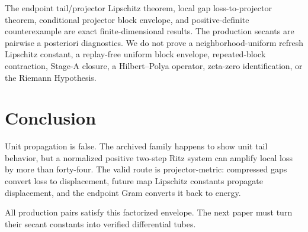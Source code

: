 \documentclass[11pt]{article}
\theoremstyle{definition}
\theoremstyle{remark}
\begin{document}
The endpoint tail/projector Lipschitz theorem, local gap loss-to-projector
theorem, conditional projector block envelope, and positive-definite
counterexample are exact finite-dimensional results.  The production secants
are pairwise a posteriori diagnostics.  We do not prove a neighborhood-uniform
refresh Lipschitz constant, a replay-free uniform block envelope,
repeated-block contraction, Stage-A closure, a Hilbert--Polya operator,
zeta-zero identification, or the Riemann Hypothesis.

\section{Conclusion}

Unit propagation is false.  The archived family happens to show unit tail
behavior, but a normalized positive two-step Ritz system can amplify local
loss by more than forty-four.  The valid route is projector-metric:
compressed gaps convert loss to displacement, future map Lipschitz constants
propagate displacement, and the endpoint Gram converts it back to energy.

All production pairs satisfy this factorized envelope.  The next paper must
turn their secant constants into verified differential tubes.



\end{document}
